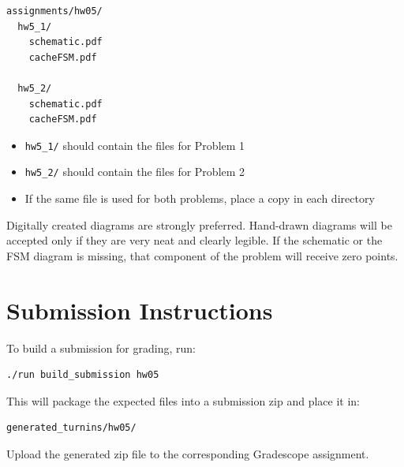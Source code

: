 \documentclass[12pt]{article}
\begin{document}
\begin{verbatim}
assignments/hw05/
  hw5_1/
    schematic.pdf
    cacheFSM.pdf

  hw5_2/
    schematic.pdf
    cacheFSM.pdf
\end{verbatim}

\begin{itemize}
\item \texttt{hw5\_1/} should contain the files for Problem 1
\item \texttt{hw5\_2/} should contain the files for Problem 2
\item If the same file is used for both problems, place a copy in each directory
\end{itemize}

Digitally created diagrams are strongly preferred.
Hand-drawn diagrams will be accepted only if they are very neat and clearly legible.
If the schematic or the FSM diagram is missing, that component of the problem will receive zero points.

\section*{Submission Instructions}

To build a submission for grading, run:

\begin{verbatim}
./run build_submission hw05
\end{verbatim}

This will package the expected files into a submission zip and place it in:

\begin{verbatim}
generated_turnins/hw05/
\end{verbatim}

Upload the generated zip file to the corresponding Gradescope assignment.
\end{document}
